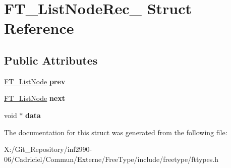 \hypertarget{struct_f_t___list_node_rec__}{\section{F\-T\-\_\-\-List\-Node\-Rec\-\_\- Struct Reference}
\label{struct_f_t___list_node_rec__}
}
\subsection*{Public Attributes}
\begin{DoxyCompactItemize}
\item 
\hypertarget{struct_f_t___list_node_rec___a41c77950e6940b1b98e04709b705c046}{\hyperlink{struct_f_t___list_node_rec__}{F\-T\-\_\-\-List\-Node} {\bfseries prev}}\label{struct_f_t___list_node_rec___a41c77950e6940b1b98e04709b705c046}

\item 
\hypertarget{struct_f_t___list_node_rec___a8275962fa8c92b77435cb4fa76251f39}{\hyperlink{struct_f_t___list_node_rec__}{F\-T\-\_\-\-List\-Node} {\bfseries next}}\label{struct_f_t___list_node_rec___a8275962fa8c92b77435cb4fa76251f39}

\item 
\hypertarget{struct_f_t___list_node_rec___ab0202be88f722442a4bec9aeb5f6418f}{void $\ast$ {\bfseries data}}\label{struct_f_t___list_node_rec___ab0202be88f722442a4bec9aeb5f6418f}

\end{DoxyCompactItemize}


The documentation for this struct was generated from the following file\-:\begin{DoxyCompactItemize}
\item 
X\-:/\-Git\-\_\-\-Repository/inf2990-\/06/\-Cadriciel/\-Commun/\-Externe/\-Free\-Type/include/freetype/fttypes.\-h\end{DoxyCompactItemize}
